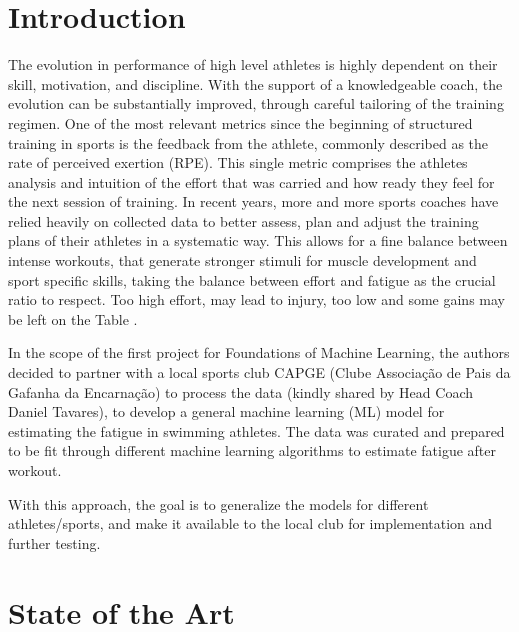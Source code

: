 \documentclass[conference]{IEEEtran}
\begin{document}
\IEEEpeerreviewmaketitle


\section{Introduction}
The evolution in performance of high level athletes is highly dependent on their skill, motivation, and discipline. With the support of a knowledgeable coach, the evolution can be substantially improved, through careful tailoring of the training regimen. One of the most relevant metrics since the beginning of structured training in sports is the feedback from the athlete, commonly described as the rate of perceived exertion (RPE). This single metric comprises the athletes analysis and intuition of the effort that was carried and how ready they feel for the next session of training. In recent years, more and more sports coaches have relied heavily on collected data to better assess, plan and adjust the training plans of their athletes in a systematic way. This allows for a fine balance between intense workouts, that generate stronger stimuli for muscle development and sport specific skills, taking the balance between effort and fatigue as the crucial ratio to respect. Too high effort, may lead to injury, too low and some gains may be left on the Table \cite{Zatsiorsky2019}. 

In the scope of the first project for Foundations of Machine Learning, the authors decided to partner with a local sports club CAPGE (Clube Associação de Pais da Gafanha da Encarnação) to process the data (kindly shared by Head Coach Daniel Tavares), to develop a general machine learning (ML) model for estimating the fatigue in swimming athletes. The data was curated and prepared to be fit through different machine learning algorithms to estimate fatigue after workout.

With this approach, the goal is to generalize the models for different athletes/sports, and make it available to the local club for implementation and further testing. 



\section{State of the Art}
\end{document}

